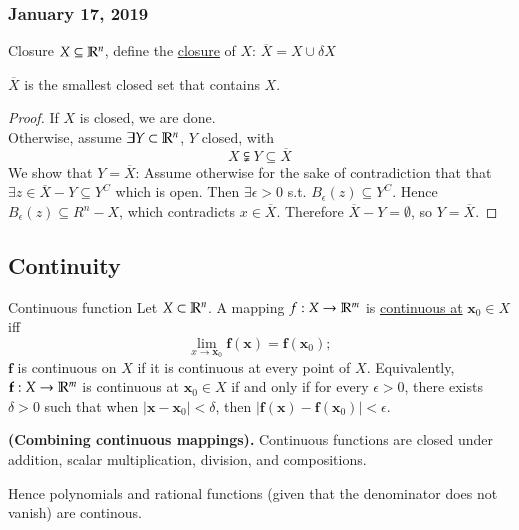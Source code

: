 \subsubsection*{January 17, 2019}

\begin{defn}{Closure}
  $X \subseteq \mathbb{R}^n$, define the \ul{closure} of $X$: $\overline{X}=X\cup \delta X$
\end{defn}
\begin{theorem}
  $\overline{X}$ is the smallest closed set that contains $X$.
\end{theorem}
\begin{proof}
  If $X$ is closed, we are done. \\
  Otherwise, assume $\exists Y\subset \mathbb{R}^n$, $Y$ closed, with
  \[X\subsetneqq Y \subseteq \overline{X}\]
  We show that $Y=\overline{X}$: Assume otherwise for the sake of contradiction that that $\exists z\in \overline{X} - Y\subseteq Y^C$ which is open. Then $\exists \epsilon > 0$ s.t. $B_\epsilon (z)\subseteq Y^C$. Hence $B_\epsilon (z)\subseteq R^n-X $, which contradicts $x\in \overline{X}$. Therefore $\overline{X}-Y=\emptyset$, so $Y=\overline{X}$.
\end{proof}

\subsection{Continuity}
\begin{defn}{Continuous function}
Let $X\subset \mathbb{R}^n$. A mapping $f : X\rightarrow \mathbb{R}^m$ is \ul{continuous at} $\bm{x}_0\in X$ iff
  \begin{equation}
  	\lim_{x\rightarrow \bm{x}_0} \bm{f}(\bm{x}) = \bm{f}(\bm{x}_0);
  \end{equation}
  $\bm{f}$ is continuous on $X$ if it is continuous at every point of $X$. Equivalently, $\textbf{f}: X\rightarrow \mathbb{R}^m$ is continuous at $\bm{x}_0\in X$ if and only if for every $\epsilon > 0$, there exists $\delta>0$ such that when $|\bm{x}-\bm{x}_0|<\delta$, then $|\bm{f}(\bm{x})-\bm{f}(\bm{x}_0)|<\epsilon$.
\end{defn}

\begin{theorem}
  \textbf{(Combining continuous mappings).} Continuous functions are closed under addition, scalar multiplication, division, and compositions.
\end{theorem}

\begin{lemma}
Hence polynomials and rational functions (given that the denominator does not vanish) are continous.
\end{lemma}

